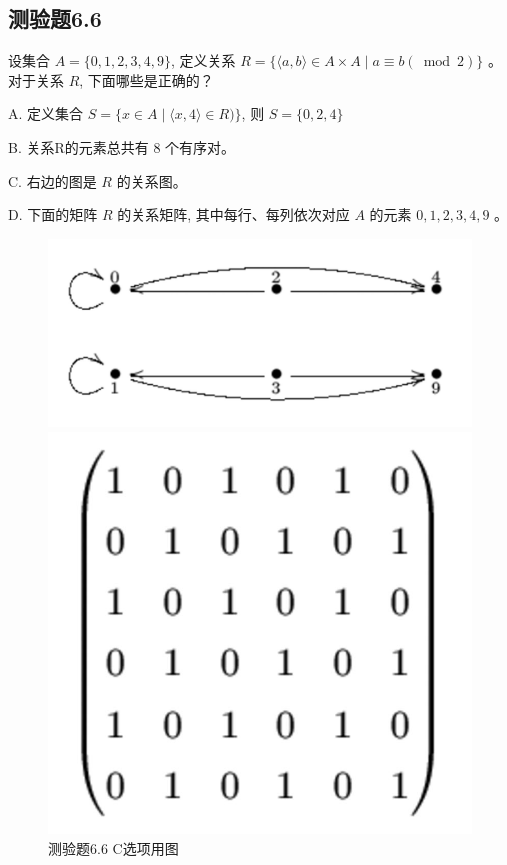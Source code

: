 \documentclass[UTF8, heading=true]{ctexart}
\begin{document}
\subsection{测验题6.6}

设集合 $A=\{0,1,2,3,4,9\}$, 定义关系 $R=\{\langle a, b\rangle \in A \times A \mid a \equiv b(\bmod 2)\}$ 。对于关系 $R$, 下面哪些是正确的？

A. 定义集合 $S=\{x \in A \mid\langle x, 4\rangle \in R)\}$, 则 $S=\{0,2,4\}$

B. 关系R的元素总共有 8 个有序对。

C. 右边的图是 $R$ 的关系图。

D. 下面的矩阵 $R$ 的关系矩阵, 其中每行、每列依次对应 $A$ 的元素 $0,1,2,3,4,9$ 。


\begin{figure}[H]
    \centering
    \begin{minipage}[t]{0.45\textwidth}
        \centering
        \includegraphics[width=1\textwidth]{6.6_1.jpg} %
	      \vspace{-0.3cm}
        \caption{测验题6.6 C选项用图}
    \end{minipage}
	  \hspace{0.15\textwidth} %
    \begin{minipage}[t]{0.23\textwidth}
        \centering
        \includegraphics[width=1\textwidth]{6.6_2.jpg} %

\end{minipage}
\end{figure}
\end{document}
